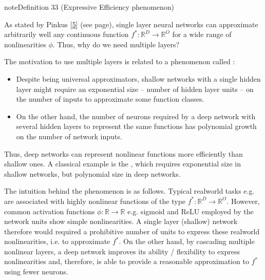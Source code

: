 \documentclass[letterpaper,10pt,english]{jupyterBook}
\begin{document}
\begin{sphinxadmonition}{note}{Definition 33 (Expressive Efficiency phenomenon)}



\sphinxAtStartPar
As stated by Pinkus {[}\hyperlink{cite.bibliography:id17}{5}{]} (see {\hyperref[\detokenize{neuralnets_func_approx::doc}]{}} page), single layer neural networks can approximate arbitrarily well any continuous function \(f^{\ast} \colon \mathbb{R}^{D} \rightarrow \mathbb{R}^{O}\) for a wide range of non\sphinxhyphen{}linearities \(\phi\). Thus, why do we need multiple layers?

\sphinxAtStartPar
The motivation to use multiple layers is related to a phenomenon called :
\begin{itemize}
\item {} 
\sphinxAtStartPar
Despite being universal approximators, shallow networks with a single hidden layer might require an exponential size – number of hidden layer units – on the number of inputs to approximate some function classes.

\item {} 
\sphinxAtStartPar
On the other hand, the number of neurons required by a deep network with several hidden layers to represent the same functions has polynomial growth on the number of network inputs.

\end{itemize}

\sphinxAtStartPar
Thus, deep networks can represent non\sphinxhyphen{}linear functions more efficiently than shallow ones. A classical example is the , which requires exponential size in shallow networks, but polynomial size in deep networks.

\sphinxAtStartPar
The intuition behind the  phenomenon is as follows. Typical real\sphinxhyphen{}world tasks e.g.  are associated with highly non\sphinxhyphen{}linear functions of the type \(f^{\ast} \colon \mathbb{R}^{D} \rightarrow \mathbb{R}^{O} \). However, common activation functions \(\phi \colon \mathbb{R} \rightarrow \mathbb{R} \) e.g. sigmoid and ReLU employed by the network units show simple non\sphinxhyphen{}linearities. A single layer (shallow) network therefore would required a prohibitive number of units to express these real\sphinxhyphen{}world non\sphinxhyphen{}linearities, i.e. to approximate \(f^{\ast} \). On the other hand, by cascading multiple non\sphinxhyphen{}linear layers, a deep network improves its ability / flexibility to express non\sphinxhyphen{}linearities and, therefore, is able to provide a reasonable approximation to \(f^{\ast} \) using fewer neurons.
\end{sphinxadmonition}
\end{document}
